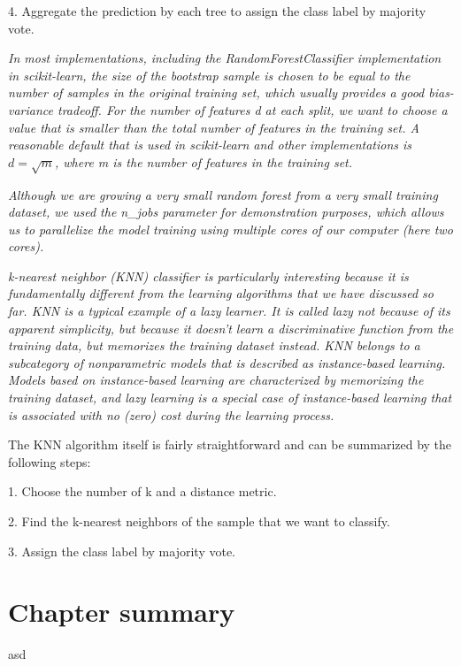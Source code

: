 4. Aggregate the prediction by each tree to assign the class label by majority vote.

\textit{In most implementations, including the RandomForestClassifier implementation in scikit-learn, the size of the bootstrap sample is chosen to be equal to the number of samples in the original training set, which usually provides a good bias-variance tradeoff. For the number of features d at each split, we want to choose a value that is smaller than the total number of features in the training set. A reasonable default that is used in scikit-learn and other implementations is $d=\sqrt{m}$, where m is the number of features in the training set.}

\textit{Although we are growing a very small random forest from a very small training dataset, we used the n\_jobs parameter for demonstration purposes, which allows us to parallelize the model training using multiple cores of our computer (here two cores).}

\textit{k-nearest neighbor (KNN) classifier is particularly interesting because it is fundamentally different from the learning algorithms that we have discussed so far.  KNN is a typical example of a lazy learner. It is called lazy not because of its apparent simplicity, but because it doesn't learn a discriminative function from the training data, but memorizes the training dataset instead. KNN belongs to a subcategory of nonparametric models that is described as instance-based learning. Models based on instance-based learning are characterized by memorizing the training dataset, and lazy learning is a special case of instance-based learning that is associated with no (zero) cost during the learning process.}

The KNN algorithm itself is fairly straightforward and can be summarized by the following steps:

1. Choose the number of k and a distance metric.

2. Find the k-nearest neighbors of the sample that we want to classify.

3. Assign the class label by majority vote.

\section{Chapter summary} \label{sec:ml_workflow_summary}
asd